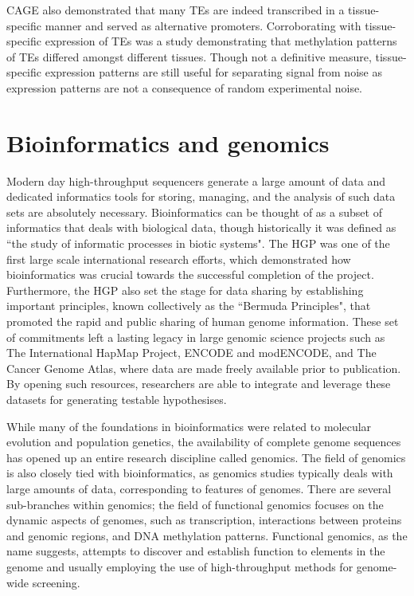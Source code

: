CAGE also demonstrated that many TEs are indeed transcribed in a tissue-specific manner and served as alternative promoters\cite{pmid19377475}. Corroborating with tissue-specific expression of TEs was a study demonstrating that methylation patterns of TEs differed amongst different tissues\cite{pmid23708189}. Though not a definitive measure, tissue-specific expression patterns are still useful for separating signal from noise as expression patterns are not a consequence of random experimental noise.

\section{Bioinformatics and genomics}

Modern day high-throughput sequencers generate a large amount of data and dedicated informatics tools for storing, managing, and the analysis of such data sets are absolutely necessary. Bioinformatics can be thought of as a subset of informatics that deals with biological data, though historically it was defined as ``the study of informatic processes in biotic systems"\cite{pmid21483479}. The HGP was one of the first large scale international research efforts, which demonstrated how bioinformatics was crucial towards the successful completion of the project\cite{stein1996perl}. Furthermore, the HGP also set the stage for data sharing by establishing important principles, known collectively as the ``Bermuda Principles", that promoted the rapid and public sharing of human genome information. These set of commitments left a lasting legacy in large genomic science projects such as The International HapMap Project, ENCODE and modENCODE, and The Cancer Genome Atlas, where data are made freely available prior to publication\cite{contreras2011bermuda}. By opening such resources, researchers are able to integrate and leverage these datasets for generating testable hypothesises.

While many of the foundations in bioinformatics were related to molecular evolution and population genetics, the availability of complete genome sequences has opened up an entire research discipline called genomics. The field of genomics is also closely tied with bioinformatics, as genomics studies typically deals with large amounts of data, corresponding to features of genomes. There are several sub-branches within genomics; the field of functional genomics focuses on the dynamic aspects of genomes, such as transcription, interactions between proteins and genomic regions, and DNA methylation patterns. Functional genomics, as the name suggests, attempts to discover and establish function to elements in the genome and usually employing the use of high-throughput methods for genome-wide screening.

